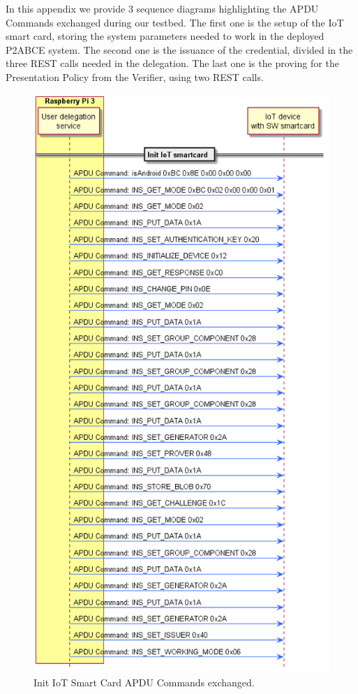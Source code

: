 In this appendix we provide 3 sequence diagrams highlighting the APDU Commands exchanged during our testbed. The first one is the setup of the IoT smart card, storing the system parameters needed to work in the deployed P2ABCE system. The second one is the issuance of the credential, divided in the three REST calls needed in the delegation. The last one is the proving for the Presentation Policy from the Verifier, using two REST calls.


\begin{figure}[bth]
	\begin{center}
		\includegraphics[width=0.9\linewidth]{gfx/UML/APDUsInitIoTSC}
	\end{center}
	\caption{Init IoT Smart Card APDU Commands exchanged.}
	\label{fig:APDUsInitIoTSC}
\end{figure}

